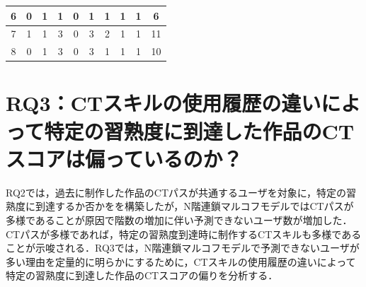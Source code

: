 \documentclass[submit]{ipsj}
\begin{document}
\begin{table}[t]
{\begin{tabular}{c|c|cccccccc}
6                   & 0                                           & \multicolumn{1}{c|}{1} & \multicolumn{1}{c|}{1} & \multicolumn{1}{c|}{0} & \multicolumn{1}{c|}{1} & \multicolumn{1}{c|}{1} & \multicolumn{1}{c|}{1} & \multicolumn{1}{c|}{1} & 6  \\ \hline
7                   & 1                                           & \multicolumn{1}{c|}{1} & \multicolumn{1}{c|}{3} & \multicolumn{1}{c|}{0} & \multicolumn{1}{c|}{3} & \multicolumn{1}{c|}{2} & \multicolumn{1}{c|}{1} & \multicolumn{1}{c|}{1} & 11  \\ \hline
8                   & 0                                           & \multicolumn{1}{c|}{1} & \multicolumn{1}{c|}{3} & \multicolumn{1}{c|}{0} & \multicolumn{1}{c|}{3} & \multicolumn{1}{c|}{1} & \multicolumn{1}{c|}{1} & \multicolumn{1}{c|}{1} & 10  \\ \hline
\end{tabular}
}
  \end{table}







\section{RQ3：CTスキルの使用履歴の違いによって特定の習熟度に到達した作品のCTスコアは偏っているのか？}
\label{sec:rq3}

RQ2では，過去に制作した作品のCTパスが共通するユーザを対象に，特定の習熟度に到達するか否かを\textcolor{red}{}を構築したが，N階連鎖マルコフモデルではCTパスが多様であることが原因で階数の増加に伴い予測できないユーザ数が増加した．CTパスが多様であれば，特定の習熟度到達時に制作するCTスキルも多様であることが示唆される．RQ3では，N階連鎖マルコフモデルで予測できないユーザが多い理由を定量的に明らかにするために，CTスキルの使用履歴の違いによって特定の習熟度に到達した作品のCTスコアの偏りを分析する．
\end{document}
